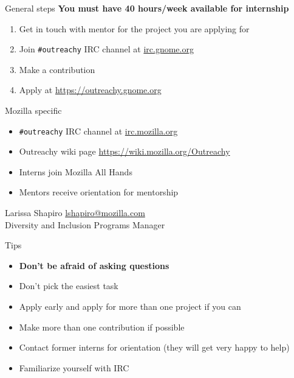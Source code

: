 \documentclass[pdf]{beamer}
\begin{document}
\begin{frame}{General steps}
  \textbf{You must have 40 hours/week available for internship}

  \begin{enumerate}
    \item Get in touch with mentor for the project you are applying for
    \item Join \texttt{\#outreachy} IRC channel at \url{irc.gnome.org}
    \item Make a contribution
    \item Apply at \url{https://outreachy.gnome.org}
  \end{enumerate}
\end{frame}

\begin{frame}{Mozilla specific}
  \begin{itemize}
    \item \texttt{\#outreachy} IRC channel at \url{irc.mozilla.org}
    \item Outreachy wiki page \url{https://wiki.mozilla.org/Outreachy}
    \item Interns join Mozilla All Hands
    \item Mentors receive orientation for mentorship
  \end{itemize}

  \begin{center}
    Larissa Shapiro \href{mailto:lshapiro@mozilla.com}{lshapiro@mozilla.com}\\
    Diversity and Inclusion Programs Manager
  \end{center}
\end{frame}

\begin{frame}{Tips}
  \begin{itemize}
    \item \textbf{Don't be afraid of asking questions}
    \item Don't pick the easiest task
    \item Apply early and apply for more than one project if you can
    \item Make more than one contribution if possible
    \item Contact former interns for orientation (they will get very happy to help)
    \item Familiarize yourself with IRC
  \end{itemize}
\end{frame}
\end{document}
